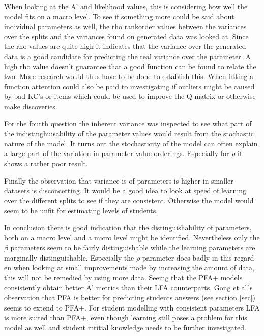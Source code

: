 \documentclass{scrartcl}
\begin{document}
When looking at the A' and likelihood values, this is considering how well the model fits on a macro level. To see if something more could be said about individual parameters as well, the rho rankorder values between the variances over the splits and the variances found on generated data was looked at. Since the rho values are quite high it indicates that the variance over the generated data is a good candidate for predicting the real variance over the parameter. A high rho value doesn't guarantee that a good function can be found to relate the two. More research would thus have to be done to establish this. When fitting a function attention could also be paid to investigating if outliers might be caused by bad KC's or items which could be used to improve the Q-matrix or otherwise make discoveries.

For the fourth question the inherent variance was inspected to see what part of the indistinghuisability of the parameter values would result from the stochastic nature of the model. It turns out the stochasticity of the model can often explain a large part of the variation in parameter value orderings. Especially for $\rho$ it shows a rather poor result. 

Finally the observation that variance is of parameters is higher in smaller datasets is disconcerting. It would be a good idea to look at speed of learning over the different splits to see if they are consistent. Otherwise the model would seem to be unfit for estimating levels of students.

In conclusion there is good indication that the distinguishability of parameters, both on a macro level and a micro level might be identified. Nevertheless only the $\beta$ parameters seem to be fairly distinguishable while the learning parameters are marginally distinguishable. Especially the $\rho$ parameter does badly in this regard en when looking at small improvements made by increasing the amount of data, this will not be remedied by using more data. Seeing that the PFA+ models consistently obtain better A' metrics than their LFA counterparts, Gong et al.'s observation that PFA is better for predicting students answers (see section \ref{sec}) seems to extend to PFA+. For student modelling with consistent parameters LFA is more suited than PFA+, even though learning still poses a problem for this model as well and student intitial knowledge needs to be further investigated.
\end{document}
